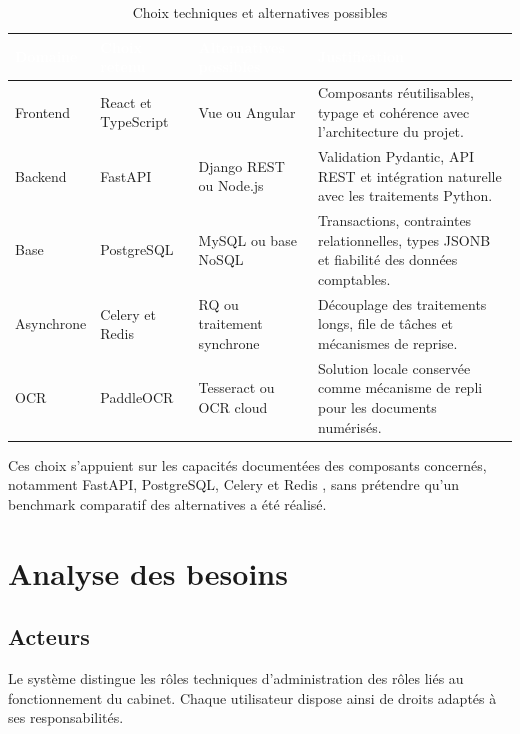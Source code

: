 \documentclass[12pt,a4paper,oneside]{report}
\newcommand{\TableSetup}{%
  \arrayrulecolor{ComptaTableLine}%
  \setlength{\arrayrulewidth}{0.45pt}%
  \renewcommand{\arraystretch}{1.18}%
}
\newcommand{\TableHead}[1]{\textcolor{white}{\textbf{#1}}}
\begin{document}
\begin{table}[H]
\centering
\caption{Choix techniques et alternatives possibles}
\footnotesize
\TableSetup
\begin{tabularx}{\textwidth}{|L{2.2cm}|L{3.4cm}|L{3.4cm}|Y|}
\toprule
{}\TableHead{Domaine} & \TableHead{Choix retenu} & \TableHead{Alternatives possibles} & \TableHead{Justification} \\
\midrule
Frontend & React et TypeScript & Vue ou Angular & Composants réutilisables, typage et cohérence avec l'architecture du projet. \\
Backend & FastAPI & Django REST ou Node.js & Validation Pydantic, API REST et intégration naturelle avec les traitements Python. \\
Base & PostgreSQL & MySQL ou base NoSQL & Transactions, contraintes relationnelles, types JSONB et fiabilité des données comptables. \\
Asynchrone & Celery et Redis & RQ ou traitement synchrone & Découplage des traitements longs, file de tâches et mécanismes de reprise. \\
OCR & PaddleOCR & Tesseract ou OCR cloud & Solution locale conservée comme mécanisme de repli pour les documents numérisés. \\
\bottomrule
\end{tabularx}
\end{table}

Ces choix s'appuient sur les capacités documentées des composants concernés,
notamment FastAPI, PostgreSQL, Celery et Redis
\cite{fastapi,postgresql,celery,redis}, sans prétendre qu'un benchmark comparatif
des alternatives a été réalisé.

\chapter{Analyse des besoins}

\section{Acteurs}

Le système distingue les rôles techniques d'administration des rôles liés au fonctionnement du cabinet. Chaque utilisateur dispose ainsi de droits adaptés à ses responsabilités.
\end{document}
